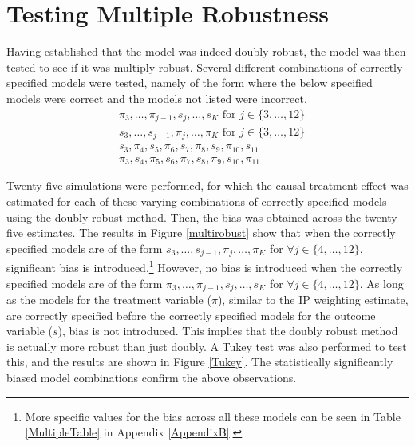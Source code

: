 \section{Testing Multiple Robustness} \label{multiplerobust}
Having established that the model was indeed doubly robust, the model was then tested to see if it was multiply robust.  Several different combinations of correctly specified models were tested, namely of the form where the below specified models were correct and the models not listed were incorrect.  
\begin{align} 
& \pi_3, \dots, \pi_{j-1}, s_j, \dots, s_K \text{ for } j \in \{3, \dots, 12 \} \\
& s_3, \dots, s_{j-1}, \pi_j, \dots, \pi_K\text{ for } j \in \{3, \dots, 12 \}   \\
& s_3, \pi_4, s_5, \pi_6, s_7, \pi_8, s_9, \pi_{10}, s_{11}\\
& \pi_3, s_4, \pi_5, s_6, \pi_7, s_8, \pi_9, s_{10}, \pi_{11}
\end{align} 

Twenty-five simulations were performed, for which the causal treatment effect was estimated for each of these varying combinations of correctly specified models using the doubly robust method.   Then, the bias was obtained across the twenty-five estimates.  The results in Figure \ref{multirobust} show that when the correctly specified models are of the form $s_3, \dots, s_{j-1}, \pi_j, \dots, \pi_K$ for $\forall j \in \{4, \dots, 12 \} $, significant bias is introduced.\footnote{More specific values for the bias across all these models can be seen in Table \ref{MultipleTable} in Appendix \ref{AppendixB}.}  However, no bias is introduced when the correctly specified models are of the form $\pi_3, \dots, \pi_{j-1}, s_j, \dots, s_K $ for  $\forall j \in \{4, \dots, 12 \}$.  As long as the models for the treatment variable ($\pi$), similar to the IP weighting estimate, are correctly specified before the correctly specified models for the outcome variable ($s$), bias is not introduced. This implies that the doubly robust method is actually more robust than just doubly.  A Tukey test was also performed to test this, and the results are shown in Figure \ref{Tukey}.  The statistically significantly biased model combinations confirm the above observations.  


